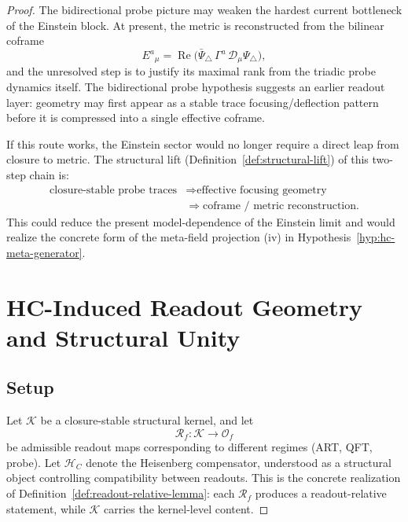 \begin{proof}
The bidirectional probe picture may weaken the hardest current
bottleneck of the Einstein block. At present, the metric is reconstructed
from the bilinear coframe
\[
  E^a{}_\mu
  =
  \operatorname{Re}\bigl(
    \bar\Psi_\triangle\,\Gamma^a\,\mathcal{D}_\mu\Psi_\triangle
  \bigr),
\]
and the unresolved step is to justify its maximal rank from the triadic
probe dynamics itself. The bidirectional probe hypothesis suggests an
earlier readout layer: geometry may first appear as a stable trace
focusing/deflection pattern before it is compressed into a single
effective coframe.

\begin{remark}
If this route works, the Einstein sector would no longer require a
direct leap from closure to metric. The structural lift
(Definition~\ref{def:structural-lift}) of this two-step chain is:
\[
\begin{aligned}
\text{closure-stable probe traces}
&\Longrightarrow \text{effective focusing geometry}\\
&\Longrightarrow \text{coframe / metric reconstruction}.
\end{aligned}
\]
This could reduce the present model-dependence of the Einstein limit and
would realize the concrete form of the meta-field projection
(iv) in Hypothesis~\ref{hyp:hc-meta-generator}.
\end{remark}


\section{HC-Induced Readout Geometry and Structural Unity}
\label{sec:theorem7}

\subsection*{Setup}

Let $\mathcal{K}$ be a closure-stable structural kernel, and let
\[
  \mathcal{R}_f : \mathcal{K} \to \mathcal{O}_f
\]
be admissible readout maps corresponding to different regimes (ART,
QFT, probe). Let $\mathcal{H}_C$ denote the Heisenberg compensator,
understood as a structural object controlling compatibility between
readouts. This is the concrete realization of
Definition~\ref{def:readout-relative-lemma}: each $\mathcal{R}_f$
produces a readout-relative statement, while $\mathcal{K}$ carries the
kernel-level content.


\end{proof}
